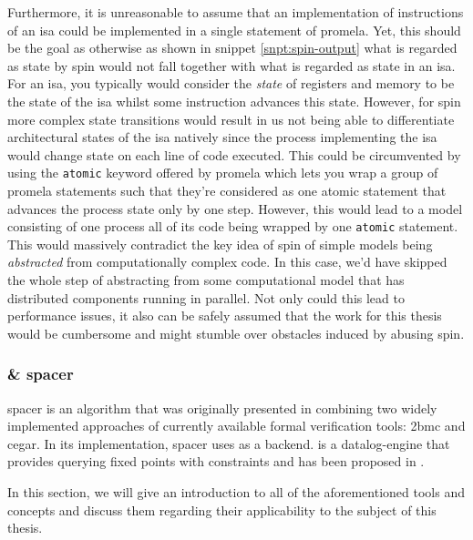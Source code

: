 Furthermore, it is unreasonable to assume that an implementation of instructions of an \gls{isa} could be implemented in a single statement of \gls{promela}.
Yet, this should be the goal as otherwise as shown in snippet \ref{snpt:spin-output} what is regarded as state by \gls{spin} would not fall together with what is regarded as state in an \gls{isa}.
For an \gls{isa}, you typically would consider the \textit{state} of registers and memory to be the state of the \gls{isa} whilst some instruction advances this state.
However, for \gls{spin} more complex state transitions would result in us not being able to differentiate architectural states of the \gls{isa} natively since the process implementing the \gls{isa} would change state on each line of code executed.
This could be circumvented by using the \lstinline{atomic} keyword offered by \gls{promela} which lets you wrap a group of \gls{promela} statements such that they're considered as one atomic statement that advances the process state only by one step.
However, this would lead to a model consisting of one process all of its code being wrapped by one \lstinline{atomic} statement.
This would massively contradict the key idea of \gls{spin} of simple models being \textit{abstracted} from computationally complex code.
In this case, we'd have skipped the whole step of abstracting from some computational model that has distributed components running in parallel.
Not only could this lead to performance issues, it also can be safely assumed that the work for this thesis would be cumbersome and might stumble over obstacles induced by abusing \gls{spin}.

\subsubsection{\muZ{} \& \gls{spacer}}

\gls{spacer} is an algorithm that was originally presented in \cite{Komuravelli13} combining two widely implemented approaches of currently available formal verification tools: \gls{2bmc} and \gls{cegar}.
In its implementation, \gls{spacer} uses \muZ{} as a backend.
\muZ{} is a \gls{datalog}-engine that provides querying fixed points with constraints and has been proposed in \cite{Hoder11}.

In this section, we will give an introduction to all of the aforementioned tools and concepts and discuss them regarding their applicability to the subject of this thesis.


